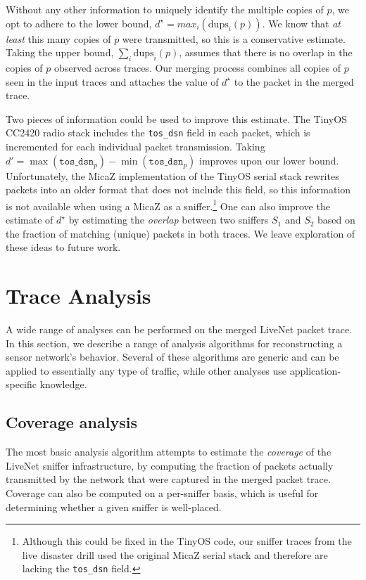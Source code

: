 Without any other information to uniquely
identify the multiple copies of $p$, we opt to adhere to the lower
bound, $d^\star = max_i (\mathrm{dups}_i(p))$. We know that {\em at least} 
this many copies of $p$ were transmitted, so this is a
conservative estimate. Taking the upper bound, 
$\sum_i \mathrm{dups}_i(p)$, assumes that there is no
overlap in the copies of $p$ observed across traces. 
Our merging process combines all copies of $p$ seen in the input
traces and attaches the value of $d^\star$ to the packet in the merged trace. 

Two pieces of information could be used to improve this estimate.
The TinyOS CC2420 radio stack includes the {\tt\verb+tos_dsn+} field in
each packet, which is incremented for each individual packet
transmission. Taking $d' = \max(\mathtt{tos\_dsn}_p) - 
\min(\mathtt{tos\_dsn}_p)$
improves upon our lower bound. Unfortunately, 
the MicaZ implementation of the TinyOS serial stack rewrites 
packets into an older format that does not include this field, so
this information is not available when using a MicaZ as a
sniffer.\footnote{Although this could be fixed in the TinyOS code,
our sniffer traces from the live disaster drill used the original
MicaZ serial stack and therefore are lacking the {\tt tos\_dsn} field.}
One can also improve the estimate of $d^\star$ by estimating the 
{\em overlap} between two sniffers $S_1$ and $S_2$ based on the
fraction of matching (unique) packets in both traces. 
We leave exploration of these ideas to future work.


\section{Trace Analysis}
\label{sec-livenet-analysis}

A wide range of analyses can be performed on the merged LiveNet 
packet trace. In this section, we describe a range of analysis
algorithms for reconstructing a sensor network's behavior. Several of
these algorithms are generic and can be applied to essentially any
type of traffic, while other analyses use application-specific
knowledge. 

\subsection{Coverage analysis}

The most basic analysis algorithm attempts to estimate the {\em
coverage} of the LiveNet sniffer infrastructure, by computing the
fraction of packets actually transmitted by the network that were
captured in the merged packet trace. Coverage can also be computed on
a per-sniffer basis, which is useful for determining whether a given
sniffer is well-placed. 

